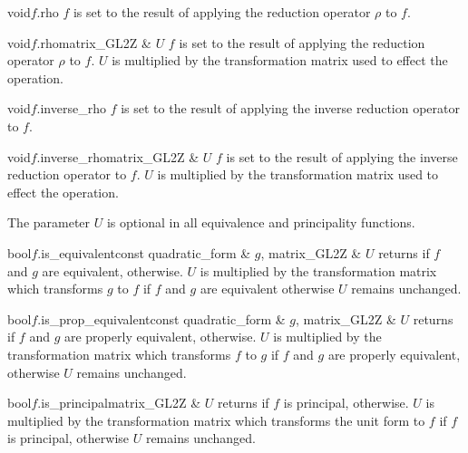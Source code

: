 \begin{fcode}{void}{$f$.rho}{}
  $f$ is set to the result of applying the reduction operator $\rho$ to $f$.
\end{fcode}

\begin{fcode}{void}{$f$.rho}{matrix_GL2Z & $U$}
  $f$ is set to the result of applying the reduction operator $\rho$ to $f$.  $U$ is multiplied
  by the transformation matrix used to effect the operation.
\end{fcode}

\begin{fcode}{void}{$f$.inverse_rho}{}
  $f$ is set to the result of applying the inverse reduction operator to $f$.
\end{fcode}

\begin{fcode}{void}{$f$.inverse_rho}{matrix_GL2Z & $U$}
  $f$ is set to the result of applying the inverse reduction operator to $f$.  $U$ is multiplied
  by the transformation matrix used to effect the operation.
\end{fcode}




The parameter $U$ is optional in all equivalence and principality functions.

\begin{cfcode}{bool}{$f$.is_equivalent}{const quadratic_form & $g$, matrix_GL2Z & $U$}
  returns \TRUE if $f$ and $g$ are equivalent, \FALSE otherwise.  $U$ is multiplied by the
  transformation matrix which transforms $g$ to $f$ if $f$ and $g$ are equivalent otherwise $U$
  remains unchanged.
\end{cfcode}

\begin{cfcode}{bool}{$f$.is_prop_equivalent}{const  quadratic_form & $g$, matrix_GL2Z & $U$}
  returns \TRUE if $f$ and $g$ are properly equivalent, \FALSE otherwise.  $U$ is multiplied by
  the transformation matrix which transforms $f$ to $g$ if $f$ and $g$ are properly equivalent,
  otherwise $U$ remains unchanged.
\end{cfcode}

\begin{cfcode}{bool}{$f$.is_principal}{matrix_GL2Z & $U$}
  returns \TRUE if $f$ is principal, \FALSE otherwise.  $U$ is multiplied by the transformation
  matrix which transforms the unit form to $f$ if $f$ is principal, otherwise $U$ remains
  unchanged.
\end{cfcode}


